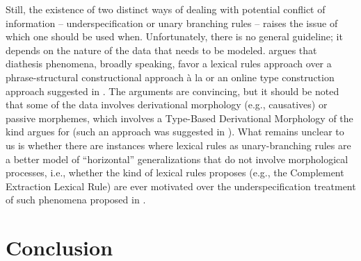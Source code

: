 \documentclass[output=paper
 	        ,biblatex
                ,babelshorthands
                ,newtxmath
                ,draftmode
                ,colorlinks, citecolor=brown
]{langscibook}
\begin{document}
Still, the existence of two distinct ways of dealing with potential conflict of information -- underspecification or unary branching rules -- raises the issue of which one should be used when. Unfortunately, there is no general guideline; it depends on the nature of the data that needs to be modeled. \citet{Mueller2006,Mueller2010} argues that diathesis phenomena, broadly speaking, favor a lexical rules approach over a phrase-structural constructional approach à la \citet{Goldberg1995} or an online type construction approach suggested in . The arguments are convincing, but it should be noted that some of the data involves derivational morphology (e.g., causatives) or passive morphemes, which involves a Type-Based Derivational Morphology of the kind \citet{Riehemann98a} argues for (such an approach was suggested in \citealt[Chapter~4]{Koenig1999c}). What remains unclear to us is whether there are instances where lexical rules as unary-branching rules are a better model of ``horizontal'' generalizations that do not involve morphological processes, i.e., whether the kind of lexical rules \citet{PollardandSag1994} proposes (e.g., the Complement Extraction Lexical Rule) are ever motivated over the  underspecification treatment of such phenomena proposed in \citet{Boumaetal2001}.

\section{Conclusion}
\end{document}
